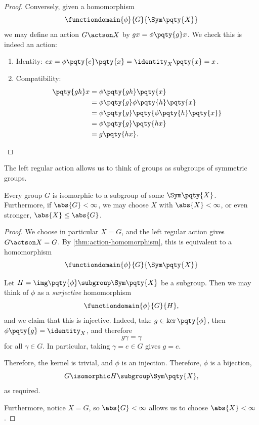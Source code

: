 \begin{proof}
    Conversely, given a homomorphism
    \[
        \functiondomain{\phi}{G}{\Sym\pqty{X}}
    \]
    we may define an action \(G \actson X\) by \(gx = \phi\pqty{g} x\). We check this is indeed an action:
    \begin{enumerate}
        \item Identity: \(ex = \phi\pqty{e} \pqty{x} = \identity_{X} \pqty{x} = x\).
        \item Compatibility:
        \begin{align*}
            \pqty{gh} x &= \phi\pqty{gh} \pqty{x} \\
            &= \phi\pqty{g} \phi\pqty{h} \pqty{x} \\
            &= \phi\pqty{g} \pqty{\phi\pqty{h} \pqty{x}} \\
            &= \phi\pqty{g} \pqty{hx} \\
            &= g \pqty{hx}.
        \end{align*}
    \end{enumerate}
\end{proof}

The left regular action allows us to think of groups as subgroups of symmetric groups.

\begin{theorem}
    \label{thm:cayley}%
    Every group \(G\) is isomorphic to a subgroup of some \(\Sym\pqty{X}\). Furthermore, if \(\abs{G} < \infty\), we may choose \(X\) with \(\abs{X} < \infty\), or even stronger, \(\abs{X} \leq \abs{G}\).
\end{theorem}

\begin{proof}
    We choose in particular \(X = G\), and the left regular action gives \(G \actson X = G\). By \autoref{thm:action-homomorphism}, this is equivalent to a homomorphism
    \[
        \functiondomain{\phi}{G}{\Sym\pqty{X}}
    \]

    Let \(H = \img \pqty{\phi} \subgroup \Sym\pqty{X}\) be a subgroup. Then we may think of \(\phi\) as a \emph{surjective} homomorphism
    \[
        \functiondomain{\phi}{G}{H},
    \]
    and we claim that this is injective. Indeed, take \(g \in \ker\pqty{\phi}\), then \(\phi\pqty{g} = \identity_{X}\), and therefore
    \[
        g \gamma = \gamma
    \]
    for all \(\gamma \in G\). In particular, taking \(\gamma = e \in G\) gives \(g = e\).

    Therefore, the kernel is trivial, and \(\phi\) is an injection. Therefore, \(\phi\) is a bijection,
    \[
        G \isomorphic H \subgroup \Sym\pqty{X},
    \]
    as required.

    Furthermore, notice \(X = G\), so \(\abs{G} < \infty\) allows us to choose \(\abs{X} < \infty\).
\end{proof}

